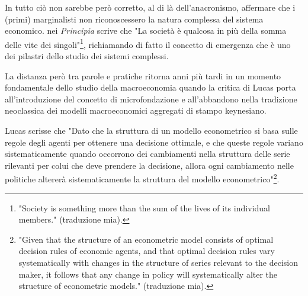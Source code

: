 \documentclass[a4paper, headings=standardclasses]{scrartcl}
\begin{document}
In tutto ciò non sarebbe però corretto, al di là dell'anacronismo, affermare che i (primi) marginalisti non riconoscessero la natura complessa del sistema economico.
\textcite[p. 20]{marshall1988} nei \textit{Principia} scrive che "La società è qualcosa in più della somma delle vite dei singoli"\footnote{"Society is something more than the sum of the lives of its individual members." (traduzione mia).}, richiamando di fatto il concetto di emergenza che è uno dei pilastri dello studio dei sistemi complessi.


La distanza però tra parole e pratiche ritorna anni più tardi in un momento fondamentale dello studio della macroeconomia quando la critica di Lucas \parencite{lucas1976} porta all'introduzione del concetto di microfondazione e all'abbandono nella tradizione neoclassica dei modelli macroeconomici aggregati di stampo keynesiano.

Lucas scrisse che "Dato che la struttura di un modello econometrico si basa sulle regole degli agenti per ottenere una decisione ottimale, e che queste regole variano sistematicamente quando occorrono dei cambiamenti nella struttura delle serie rilevanti per colui che deve prendere la decisione, allora ogni cambiamento nelle politiche altererà sistematicamente la struttura del modello econometrico"\footnote{"Given that the structure of an econometric model consists of optimal decision rules of economic agents, and that optimal decision rules vary systematically with changes in the structure of series relevant to the decision maker, it follows that any change in policy will systematically alter the structure of econometric models." \parencite{lucas1976} (traduzione mia).}.
\end{document}
